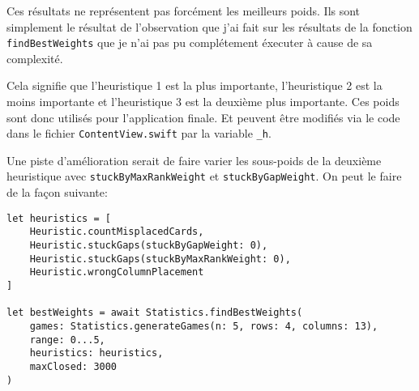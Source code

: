 Ces résultats ne représentent pas forcément les meilleurs poids. Ils sont simplement le résultat de l'observation que j'ai fait sur les résultats de la fonction \texttt{findBestWeights} que je n'ai pas pu complétement éxecuter à cause de sa complexité.

Cela signifie que l'heuristique 1 est la plus importante, l'heuristique 2 est la moins importante et l'heuristique 3 est la deuxième plus importante. Ces poids sont donc utilisés pour l'application finale. Et peuvent être modifiés via le code dans le fichier \texttt{ContentView.swift} par la variable \texttt{\_h}.

\pagebreak

Une piste d'amélioration serait de faire varier les sous-poids de la deuxième heuristique avec \texttt{stuckByMaxRankWeight} et \texttt{stuckByGapWeight}. On peut le faire de la façon suivante:
\begin{lstlisting}
let heuristics = [
    Heuristic.countMisplacedCards,
    Heuristic.stuckGaps(stuckByGapWeight: 0),
    Heuristic.stuckGaps(stuckByMaxRankWeight: 0),
    Heuristic.wrongColumnPlacement
]

let bestWeights = await Statistics.findBestWeights(
    games: Statistics.generateGames(n: 5, rows: 4, columns: 13),
    range: 0...5,
    heuristics: heuristics,
    maxClosed: 3000
)
\end{lstlisting}